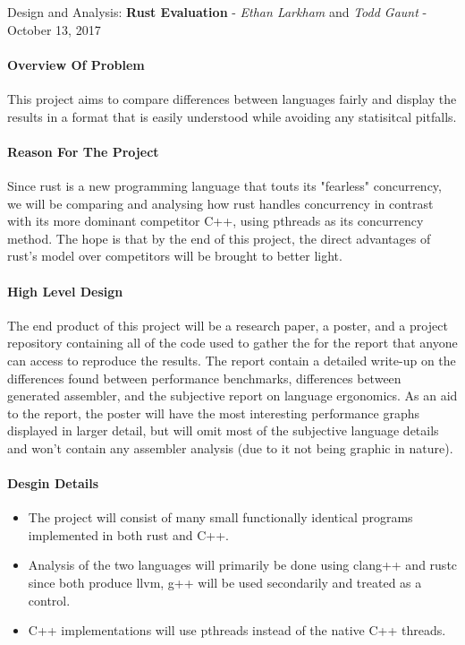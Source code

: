 \documentclass[10pt,a4paper]{report}
\begin{document}
\begin{center}
	{\Large Design and Analysis: {\bfseries Rust Evaluation}}
	- {\large{\itshape Ethan Larkham} and {\itshape Todd Gaunt}}
	- {\large October 13, 2017}
\end{center}
\vspace{0.5em}
\paragraph{Overview Of Problem}
This project aims to compare differences between languages fairly
and display the results in a format that is easily understood while avoiding
any statisitcal pitfalls.
\paragraph{Reason For The Project}
Since rust is a new programming language that touts its "fearless" concurrency,
we will be comparing and analysing how rust handles concurrency in contrast
with its more dominant competitor C++, using pthreads as its concurrency method.
The hope is that by the end of this project, the direct advantages of rust's
model over competitors will be brought to better light.
\paragraph{High Level Design}
The end product of this project will be a research paper, a poster, and a
project repository containing all of the code used to gather the for the report
that anyone can access to reproduce the results. The report contain a detailed
write-up on the differences found between performance benchmarks, differences
between generated assembler, and the subjective report on language ergonomics.
As an aid to the report, the poster will have the most interesting performance
graphs displayed in larger detail, but will omit most of the subjective
language details and won't contain any assembler analysis (due to it not being
graphic in nature).
\paragraph{Desgin Details}
\begin{flushleft}
	\begin{itemize}
		\item The project will consist of many small functionally
      identical programs implemented in both rust and C++.
    \item Analysis of the two languages will primarily be done using clang++
      and rustc since both produce llvm, g++ will be used secondarily and
      treated as a control.
		\item C++ implementations will use pthreads instead of the native C++
      threads.
	\end{itemize}
\end{flushleft}
\end{document}
